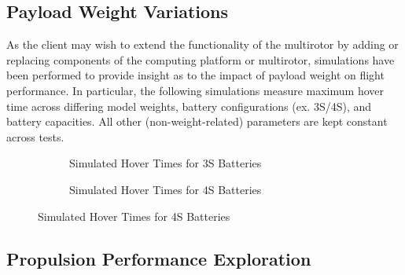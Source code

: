 \subsection{Payload Weight Variations}
As the client may wish to extend the functionality of the multirotor by adding or replacing components of the computing platform or multirotor, simulations have been performed to provide insight as to the impact of payload weight on flight performance. In particular, the following simulations measure maximum hover time across differing model weights, battery configurations (ex. 3S/4S), and battery capacities. All other (non-weight-related) parameters are kept constant across tests.

\begin{figure}[H]
\centering
\begin{subfigure}{.5\textwidth}
\caption{Simulated Hover Times for 3S Batteries}
\end{subfigure}%
\begin{subfigure}{.5\textwidth}
\centering
{}
\caption{Simulated Hover Times for 4S Batteries}
\end{subfigure}
\end{figure}
\subsection{Propulsion Performance Exploration}
\label{prop_explore}

